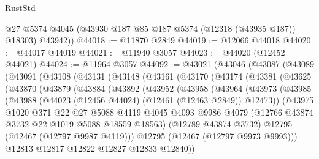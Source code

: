 \begin{lexlean}{RustStd}
\begin{coremodule}
        @27
        @5374
        @4045
        (@43930 @187 @85 @187 @5374 (@12318 (@43935 @187)) @18303)
        @43942))
@44018 := @11870 @2849
@44019 := @12066 @44018
@44020 := @44017 @44019
@44021 := @11940 @3057
@44023 := @44020 (@12452 @44021)
@44024 := @11964 @3057
@44092 := @43021
    (@43046
      (@43087
        (@43089
          (@43091
            (@43108
              (@43131
                (@43148
                  (@43161
                    (@43170
                      (@43174
                        (@43381
                          (@43625
                            (@43870
                              (@43879
                                (@43884
                                  (@43892
                                    (@43952
                                      (@43958
                                        (@43964
                                          (@43973
                                            (@43985
                                              (@43988
                                                (@44023
                                                  (@12456 @44024)
                                                  (@12461 (@12463 @2849))
                                                  @12473))
                                              (@43975
                                                @1020
                                                @371
                                                @22
                                                @27
                                                @5088
                                                @4119
                                                @4045
                                                @4093
                                                @9986
                                                @4079
                                                (@12766 @43874 @3732 @22 @1019 @5088 @18559 @18563)
                                                (@12789 @43874 @3732)
                                                @12795
                                                (@12467 (@12797 @9987 @4119)))
                                              @12795
                                              (@12467 (@12797 @9973 @9993)))
                                            @12813
                                            @12817
                                            @12822
                                            @12827
                                            @12833
                                            @12840))

\end{coremodule}
\end{lexlean}
